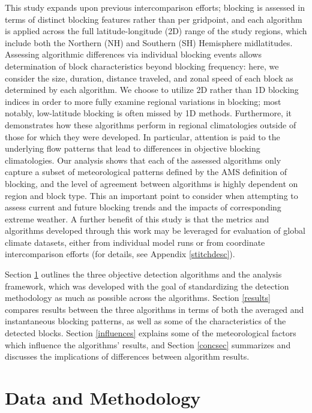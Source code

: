 \documentclass[smallextended]{svjour3}       %
\numberwithin{equation}{section}
\begin{document}
This study expands upon previous intercomparison efforts; blocking is assessed in terms of distinct blocking features rather than per gridpoint, and each algorithm is applied across the full latitude-longitude (2D) range of the study regions, which include both the Northern (NH) and Southern (SH) Hemisphere midlatitudes. Assessing algorithmic differences via individual blocking events allows determination of block characteristics beyond blocking frequency: here, we consider the size, duration, distance traveled, and zonal speed of each block as determined by each algorithm. We choose to utilize 2D rather than 1D blocking indices in order to more fully examine regional variations in blocking; most notably, low-latitude blocking is often missed by 1D methods. Furthermore, it demonstrates how these algorithms perform in regional climatologies outside of those for which they were developed. In particular, attention is paid to the underlying flow patterns that lead to differences in objective blocking climatologies. Our analysis shows that each of the assessed algorithms only capture a subset of meteorological patterns defined by the AMS definition of blocking, and the level of agreement between algorithms is highly dependent on region and block type.  This an important point to consider when attempting to assess current and future blocking trends and the impacts of corresponding extreme weather.  A further benefit of this study is that the metrics and algorithms developed through this work may be leveraged for evaluation of global climate datasets, either from individual model runs or from coordinate intercomparison efforts (for details, see Appendix \ref{stitchdesc}).


Section \ref{dataandmet} outlines the three objective detection algorithms and the analysis framework, which was developed with the goal of standardizing the detection methodology as much as possible across the algorithms. Section \ref{results} compares results between the three algorithms in terms of both the averaged and instantaneous blocking patterns, as well as some of the characteristics of the detected blocks. Section \ref{influences} explains some of the meteorological factors which influence the algorithms' results, and Section \ref{concsec} summarizes and discusses the implications of differences between algorithm results. 


\section{Data and Methodology}
\label{dataandmet}
\end{document}
